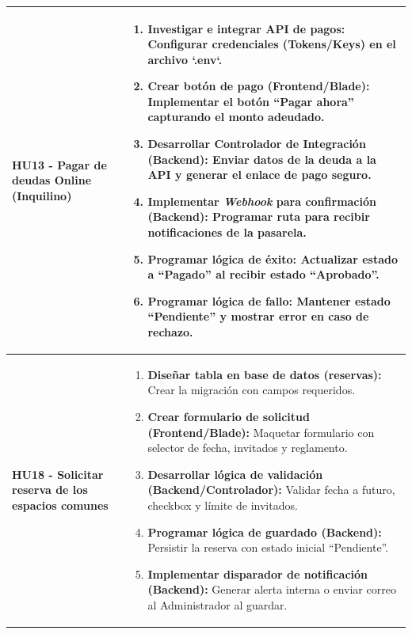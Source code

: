 \begin{longtable}{|p{4.5cm}|p{10.5cm}|}
        \textbf{HU13 - Pagar de deudas Online (Inquilino)} 
        
        & 

            \begin{enumerate}[leftmargin=*,nosep]
                \item \textbf{Investigar e integrar API de pagos:} Configurar credenciales (Tokens/Keys) en el archivo `.env`.
                \item \textbf{Crear botón de pago (Frontend/Blade):} Implementar el botón ``Pagar ahora'' capturando el monto adeudado.
                \item \textbf{Desarrollar Controlador de Integración (Backend):} Enviar datos de la deuda a la API y generar el enlace de pago seguro.
                \item \textbf{Implementar \textit{Webhook} para confirmación (Backend):} Programar ruta para recibir notificaciones de la pasarela.
                \item \textbf{Programar lógica de éxito:} Actualizar estado a ``Pagado'' al recibir estado ``Aprobado''.
                \item \textbf{Programar lógica de fallo:} Mantener estado ``Pendiente'' y mostrar error en caso de rechazo.
            \end{enumerate} 
        
    \\ \hline

        \textbf{HU18 - Solicitar reserva de los espacios comunes} 
        
        & 

            \begin{enumerate}[leftmargin=*,nosep]
                \item \textbf{Diseñar tabla en base de datos (reservas):} Crear la migración con campos requeridos.
                \item \textbf{Crear formulario de solicitud (Frontend/Blade):} Maquetar formulario con selector de fecha, invitados y reglamento.
                \item \textbf{Desarrollar lógica de validación (Backend/Controlador):} Validar fecha a futuro, checkbox y límite de invitados.
                \item \textbf{Programar lógica de guardado (Backend):} Persistir la reserva con estado inicial ``Pendiente''.
                \item \textbf{Implementar disparador de notificación (Backend):} Generar alerta interna o enviar correo al Administrador al guardar.
            \end{enumerate} 
        

\end{longtable}
